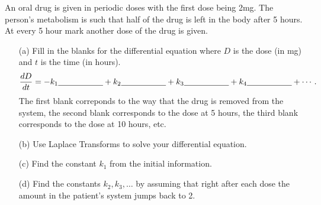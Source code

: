 \begin{problem}\label{prob:laplace_drug}
    An oral drug is given in periodic doses with the first dose being 2mg.  The person's
        metabolism is such that half of the drug is left in the body after 5 hours.  At every 5
        hour mark another dose of the drug is given.  
        \begin{enumerate}
            \item[(a)] Fill in the blanks for the differential equation where $D$ is the dose (in mg)
                and $t$ is the time (in hours).
                \[ \frac{dD}{dt} = -k_1 \underline{\hspace{0.75in}} + k_2 \underline{\hspace{0.75in}}
                + k_3 \underline{\hspace{0.75in}} + k_4 \underline{\hspace{0.75in}} + \cdots. \]
                The first blank correponds to the way that the drug is removed from the
                system, the second blank
                corresponds to the dose at 5 hours, the third blank corresponds to the
                dose at 10 hours, etc.
            \item[(b)] Use Laplace Transforms to solve your differential equation.
            \item[(c)] Find the constant $k_1$ from the initial information.  
            \item[(d)] Find the constants $k_2, k_3, \dots$ by assuming that right after each
                dose the amount in the patient's system jumps back to 2.
        \end{enumerate}
\end{problem}


